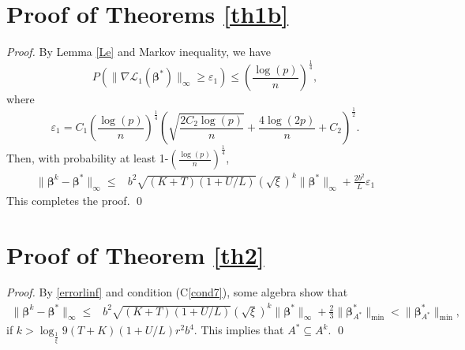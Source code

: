 \documentclass[12pt]{article}
\newcommand{\bbeta}{\boldsymbol{\beta}}
\begin{document}
\begin{appendix}
\section{Proof of Theorems \ref{th1b}}
\setcounter{equation}{0}
\def\theequation{C.\arabic{equation}}
\begin{proof}
By Lemma \ref{Le} and Markov inequality, we have
\begin{equation*}
P\left(\|\nabla \mathcal{L}_1(\bbeta^*)\|_\infty\geq\varepsilon_1\right)\leq\left(\frac{\log(p)}{n}\right)^{\frac{1}{4}},
\end{equation*}
where \begin{equation*}
\varepsilon_1= C_1\left(\frac{\log(p)}{n}\right)^{\frac{1}{4}}\left(\sqrt{\frac{2C_2\log(p)}{n}}+\frac{4\log(2p)}{n}+C_2\right)^{\frac{1}{2}}.
\end{equation*}
Then,
with probability at least
1-$\left(\frac{\log(p)}{n}\right)^{\frac{1}{4}}$,
\begin{equation}\label{errorlinf}
\begin{split}
\|\bbeta^k-\bbeta^*\|_{\infty}\leq& b^2\sqrt{(K+T)(1+U/L)}(\sqrt{\xi})^k\|\bbeta^{*}\|_{\infty}+\frac{2b^2}{L}\varepsilon_1
\end{split}
\end{equation}
This completes the proof.
\qed
\end{proof}
\section{Proof of Theorem  \ref{th2}}
\label{th2proof}
\begin{proof}
By \eqref{errorlinf} and condition %
(C\ref{cond7}),
 some algebra show that
\begin{equation*}
\begin{split}
\|\bbeta^{k}-\bbeta^{*}\|_{\infty}\leq&
b^2\sqrt{(K+T)(1+U/L)}(\sqrt{\xi})^k\|\bbeta^*\|_{\infty}+\frac{2}{3}\|\bbeta^*_{A^*}\|_{\min}< \|\bbeta^*_{A^*}\|_{\min},
\end{split}
\end{equation*}
if $k>\log_{\frac{1}{\xi}} 9 (T+K)(1+U/L)r^2b^4.$
This implies  that $A^* \subseteq A^k$.
\qed
\end{proof}
\end{appendix}




% 

% 

% 
\end{document}

